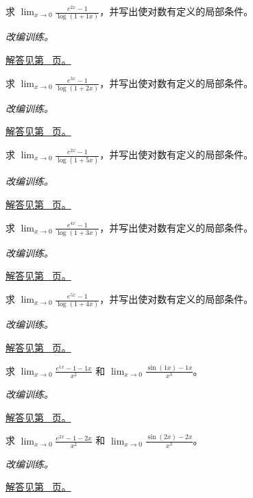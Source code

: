 \documentclass[12pt,fontset=fandol]{ctexart}
\begin{document}
\begin{example}[对数与指数复合的极限]\label{ex:c3q15}
求 $\displaystyle\lim_{x\to0}\frac{e^{2x}-1}{\log(1+1x)}$，并写出使对数有定义的局部条件。
\par\textit{改编训练。}\par\hyperref[ans:c3q15]{解答见第~\pageref{ans:c3q15} 页。}
\end{example}
\begin{example}[对数与指数复合的极限]\label{ex:c3q16}
求 $\displaystyle\lim_{x\to0}\frac{e^{3x}-1}{\log(1+2x)}$，并写出使对数有定义的局部条件。
\par\textit{改编训练。}\par\hyperref[ans:c3q16]{解答见第~\pageref{ans:c3q16} 页。}
\end{example}
\begin{example}[对数与指数复合的极限]\label{ex:c3q17}
求 $\displaystyle\lim_{x\to0}\frac{e^{2x}-1}{\log(1+5x)}$，并写出使对数有定义的局部条件。
\par\textit{改编训练。}\par\hyperref[ans:c3q17]{解答见第~\pageref{ans:c3q17} 页。}
\end{example}
\begin{example}[对数与指数复合的极限]\label{ex:c3q18}
求 $\displaystyle\lim_{x\to0}\frac{e^{4x}-1}{\log(1+3x)}$，并写出使对数有定义的局部条件。
\par\textit{改编训练。}\par\hyperref[ans:c3q18]{解答见第~\pageref{ans:c3q18} 页。}
\end{example}
\begin{example}[对数与指数复合的极限]\label{ex:c3q19}
求 $\displaystyle\lim_{x\to0}\frac{e^{5x}-1}{\log(1+4x)}$，并写出使对数有定义的局部条件。
\par\textit{改编训练。}\par\hyperref[ans:c3q19]{解答见第~\pageref{ans:c3q19} 页。}
\end{example}
\begin{example}[消去低阶项后的极限]\label{ex:c3q20}
求 $\displaystyle\lim_{x\to0}\frac{e^{1x}-1-1x}{x^2}$ 和 $\displaystyle\lim_{x\to0}\frac{\sin(1x)-1x}{x^3}$。
\par\textit{改编训练。}\par\hyperref[ans:c3q20]{解答见第~\pageref{ans:c3q20} 页。}
\end{example}
\begin{example}[消去低阶项后的极限]\label{ex:c3q21}
求 $\displaystyle\lim_{x\to0}\frac{e^{2x}-1-2x}{x^2}$ 和 $\displaystyle\lim_{x\to0}\frac{\sin(2x)-2x}{x^3}$。
\par\textit{改编训练。}\par\hyperref[ans:c3q21]{解答见第~\pageref{ans:c3q21} 页。}
\end{example}
\end{document}
